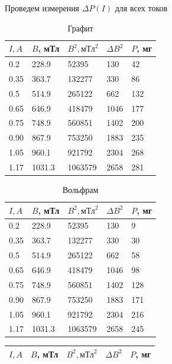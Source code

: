 \documentclass[12pt,a4paper]{article}
\begin{document}
\begin{enumerate}
Проведем измерения $\Delta P(I)$ для всех токов 
\begin{table}[h!]
    \centering
    \begin{tabular}{|l|l|l|l|l|}
    \hline
        $I, A$ & $B$, мТл & $B^2, \text{мТл}^2$ & $\Delta B^2$ & $P$, мг \\ \hline
        0.2 & 228.9 & 52395 & 130 & 42 \\ \hline
        0.35 & 363.7 & 132277 & 330 & 86 \\ \hline
        0.5 & 514.9 & 265122 & 662 & 132 \\ \hline
        0.65 & 646.9 & 418479 & 1046 & 177 \\ \hline
        0.75 & 748.9 & 560851 & 1402 & 200 \\ \hline
        0.90 & 867.9 & 753250 & 1883 & 235 \\ \hline
        1.05 & 960.1 & 921792 & 2304 & 268 \\ \hline
        1.17 & 1031.3 & 1063579 & 2658 & 281 \\ \hline
    \end{tabular}
	\caption{Графит}
\end{table}
\begin{table}[h!]
    \centering
    \begin{tabular}{|l|l|l|l|l|}
    \hline
        $I, A$ & $B$, мТл & $B^2, \text{мТл}^2$ & $\Delta B^2$ & $P$, мг \\ \hline
        0.2 & 228.9 & 52395 & 130 & 9 \\ \hline
        0.35 & 363.7 & 132277 & 330 & 30 \\ \hline
        0.5 & 514.9 & 265122 & 662 & 58 \\ \hline
        0.65 & 646.9 & 418479 & 1046 & 98 \\ \hline
        0.75 & 748.9 & 560851 & 1402 & 128 \\ \hline
        0.90 & 867.9 & 753250 & 1883 & 171 \\ \hline
        1.05 & 960.1 & 921792 & 2304 & 216 \\ \hline
        1.17 & 1031.3 & 1063579 & 2658 & 245 \\ \hline
    \end{tabular}
	\caption{Вольфрам}
\end{table}
\begin{table}[h!]
    \centering
    \begin{tabular}{|l|l|l|l|l|}
    \hline
        $I, A$ & $B$, мТл & $B^2, \text{мТл}^2$ & $\Delta B^2$ & $P$, мг \\ \hline

\end{tabular}
\end{table}
\end{enumerate}
\end{document}
